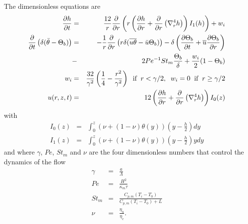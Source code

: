 The dimensionless equations are
\begin{eqnarray}
  \frac{\partial h}{\partial t}& =& \frac{12}{r}
                                    \frac{\partial}{\partial r} \left( r\left( \frac{\partial h}{\partial      r}+\frac{\partial}{\partial      r}\left(\nabla_r^4h\right)\right)I_1(h)\right)
                                    + w_i\label{EqFinal1}\\
  \frac{\partial}{\partial
  t}\left( \delta( \bar{\theta}-\Theta_b)\right)&=&-\frac{1}{r}\frac{\partial}{\partial
                                                    r}  \left(   r\delta(\overline{u\theta}-\bar{u}\Theta_b)\right)  -
                                                    \delta\left(      \frac{\partial       \Theta_b}{\partial      t}+
                                                    \overline{u}\frac{\partial     \Theta_b}{\partial    r}\right)\nonumber\\
                               &-&
                                   2Pe^{-1}St_m\frac{\Theta_b}{\delta}+\frac{w_{i}}{2}(1-\Theta_b)\label{HeatDimensionLess}\\
  w_{i}&=&
           \frac{32}{\gamma^{2}}\left(\frac{1}{4}-\frac{r^{2}}{\gamma^{2}}\right)\hspace{.2cm}
           \text{if} \hspace{.2cm} r < \gamma/2,\hspace{.2cm} w_i=0 \hspace{.2cm}
           \text{if} \hspace{.2cm} r \ge \gamma/2\\
  u(r,z,t)&   =&   12\left(   \frac{\partial   h}{\partial
                 r}+\frac{\partial}{\partial
                 r}\left(\nabla_r^4h\right)\right)I_0(z)\label{C3-Veloc}
\end{eqnarray}
with
\begin{eqnarray}
  I_0(z)&=&\int_0^z \left(\nu+(1-\nu)\theta(y)\right)\left(y-\frac{h}{2}\right)
            dy \label{I_1}\\
  I_1(z) &=& \int_0^z \left(\nu+(1-\nu)\theta(y)\right)\left(y-\frac{h}{2}\right)y dy\label{I_2}
\end{eqnarray}
and where $\gamma$, $Pe$, $St_m$  and $\nu$ are the four dimensionless
numbers that control the dynamics of the flow
\begin{eqnarray}
  \gamma&=&\frac{a}{\Lambda} \label{gamma}\\
  Pe&=&            \frac{H^2}{\kappa_m            \tau}\label{Pe}\\
  St_m &=& \frac{C_{p,m}\left(T_i-T_0\right)}{C_{p,m}\left(T_i-T_0\right)+L} \label{St}\\
  \nu&=& \frac{\eta_h}{\eta_c}\label{nu}.
\end{eqnarray}
